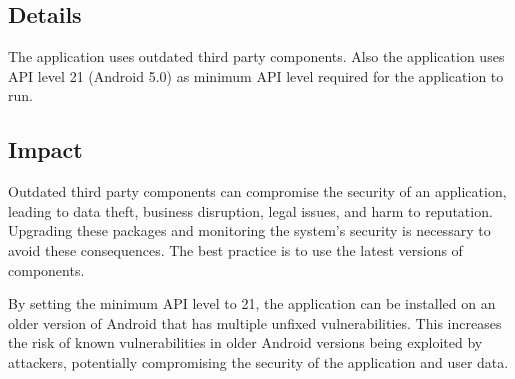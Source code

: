 %
%
%
%
\renewcommand{\FindingAuthor}{Michal Olencin}
\renewcommand{\FindingName}{Outdated Components}
\renewcommand{\Location}{dummyapplication.apk, dummyapplication.ipa}
\renewcommand{\Component}{Multiple}
\renewcommand{\FoundWith}{Manual testing}
\renewcommand{\TestMethod}{Manual}
\renewcommand{\CVSS}{2.5}
\renewcommand{\CVSSvector}{CVSS:3.1/AV:L/AC:H/PR:L/UI:N/S:U/C:L/I:N/A:N}
\renewcommand{\CWE}{1104}
\renewcommand{\Criticality}{Low}
\renewcommand{\Exploitability}{Hard}
\renewcommand{\Category}{Outdated Software}
\renewcommand{\Detectability}{Easy}


\ReportFindingHeader{\FindingName}



\subsection*{Details}

The application uses outdated third party components.
Also the application uses API level 21 (Android 5.0) as minimum API level required for the application to run.



\subsection*{Impact}

Outdated third party components can compromise the security of an application, leading to data theft, business disruption, legal issues, and harm to reputation.
Upgrading these packages and monitoring the system's security is necessary to avoid these consequences.
The best practice is to use the latest versions of components.

By setting the minimum API level to 21, the application can be installed on an older version of Android that has multiple unfixed vulnerabilities.
This increases the risk of known vulnerabilities in older Android versions being exploited by attackers, potentially compromising the security of the application and user data.

